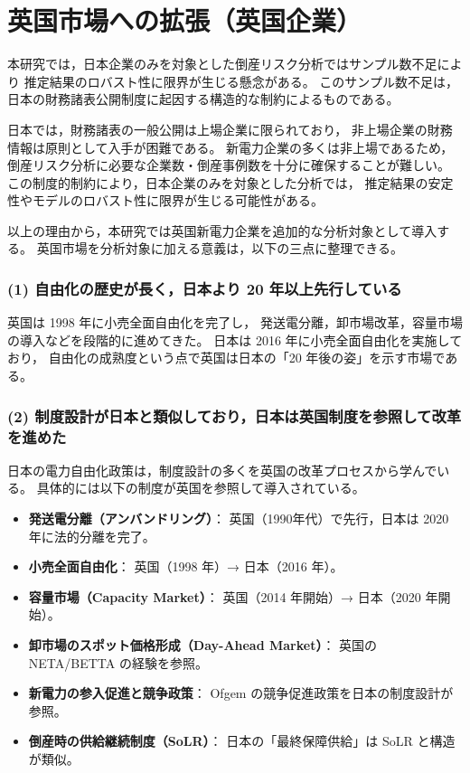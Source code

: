
\section{英国市場への拡張（英国企業）}

本研究では，日本企業のみを対象とした倒産リスク分析ではサンプル数不足により
推定結果のロバスト性に限界が生じる懸念がある。
このサンプル数不足は，日本の財務諸表公開制度に起因する構造的な制約によるものである。

日本では，財務諸表の一般公開は上場企業に限られており，
非上場企業の財務情報は原則として入手が困難である。
新電力企業の多くは非上場であるため，
倒産リスク分析に必要な企業数・倒産事例数を十分に確保することが難しい。
この制度的制約により，日本企業のみを対象とした分析では，
推定結果の安定性やモデルのロバスト性に限界が生じる可能性がある。

以上の理由から，本研究では英国新電力企業を追加的な分析対象として導入する。
英国市場を分析対象に加える意義は，以下の三点に整理できる。

\subsubsection{(1) 自由化の歴史が長く，日本より 20 年以上先行している}

英国は 1998 年に小売全面自由化を完了し，
発送電分離，卸市場改革，容量市場の導入などを段階的に進めてきた。
日本は 2016 年に小売全面自由化を実施しており，
自由化の成熟度という点で英国は日本の「20 年後の姿」を示す市場である。

\subsubsection{(2) 制度設計が日本と類似しており，日本は英国制度を参照して改革を進めた}

日本の電力自由化政策は，制度設計の多くを英国の改革プロセスから学んでいる。
具体的には以下の制度が英国を参照して導入されている。

\begin{itemize}
    \item \textbf{発送電分離（アンバンドリング）}：
    英国（1990年代）で先行，日本は 2020 年に法的分離を完了。
    \item \textbf{小売全面自由化}：
    英国（1998 年）→ 日本（2016 年）。
    \item \textbf{容量市場（Capacity Market）}：
    英国（2014 年開始）→ 日本（2020 年開始）。
    \item \textbf{卸市場のスポット価格形成（Day-Ahead Market）}：
    英国の NETA/BETTA の経験を参照。
    \item \textbf{新電力の参入促進と競争政策}：
    Ofgem の競争促進政策を日本の制度設計が参照。
    \item \textbf{倒産時の供給継続制度（SoLR）}：
    日本の「最終保障供給」は SoLR と構造が類似。
\end{itemize}


